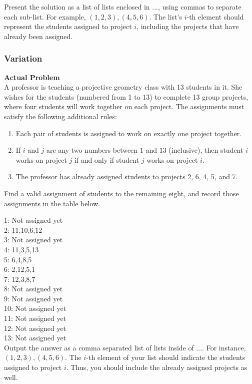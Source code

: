 Present the solution as a list of lists enclosed in $\boxed{...}$, using commas to separate each sub-list. For example, $\boxed{(1,2,3),(4,5,6)}$. The list's $i$-th element should represent the students assigned to project $i$, including the projects that have already been assigned.

\subsubsection{Variation}
\textbf{Actual Problem}\\
A professor is teaching a projective geometry class with 13 students in it. She wishes for the students (numbered from 1 to 13) to complete 13 group projects, where four students will work together on each project. The assignments must satisfy the following additional rules:

\begin{enumerate}
    \item Each pair of students is assigned to work on exactly one project together.
    \item If $i$ and $j$ are any two numbers between $1$ and $13$ (inclusive), then student $i$ works on project $j$ if and only if student $j$ works on project $i$.
    \item The professor has already assigned students to projects 2, 6, 4, 5, and 7.
\end{enumerate}

Find a valid assignment of students to the remaining eight, and record those assignments in the table below.

1: Not assigned yet \\
2: 11,10,6,12 \\
3: Not assigned yet \\
4: 11,3,5,13 \\
5: 6,4,8,5 \\
6: 2,12,5,1 \\
7: 12,3,8,7 \\
8: Not assigned yet \\
9: Not assigned yet \\
10: Not assigned yet \\
11: Not assigned yet \\
12: Not assigned yet \\
13: Not assigned yet \\

Output the answer as a comma separated list of lists inside of $\boxed{...}$. For instance, $\boxed{(1,2,3),(4,5,6)}$. The $i$-th element of your list should indicate the students assigned to project $i$. Thus, you should include the already assigned projects as well.


